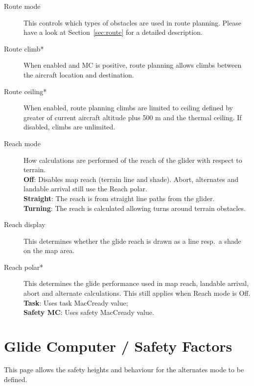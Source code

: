 \begin{description}
\item[Route mode]  \label{conf:routemode} This controls which types
  of obstacles are used in route planning. Please have a look at Section~\ref{sec:route} 
  for a detailed description.
\item[Route climb*]  \label{conf:routeclimb} When enabled and MC is positive, route 
  planning allows climbs between the aircraft location and destination.
\item[Route ceiling*]  \label{conf:routeceiling} When enabled, route planning climbs 
  are limited to ceiling defined by greater of current aircraft altitude plus 
  500 m and the thermal ceiling.  If disabled, climbs are unlimited.
\\
\item[Reach mode]  \label{conf:turningreach} How calculations are performed of 
  the reach of the glider with respect to terrain. \\
  {\bf Off}: Disables map reach (terrain line and shade). Abort, alternates
  and landable arrival still use the Reach polar. \\
  {\bf Straight}: The reach is from straight line paths from the glider. \\
  {\bf Turning}: The reach is calculated allowing turns around terrain obstacles.
\item[Reach display]  \label{conf:gliderange} This determines whether the
glide reach is drawn as a line resp.\ a shade on the map area.
\item[Reach polar*]  \label{conf:reachpolar} This determines the glide performance 
  used in map reach, landable arrival, abort and alternate calculations.
  This still applies when Reach mode is Off. \\
  {\bf Task}: Uses task MacCready value; \\
  {\bf Safety MC}: Uses safety MacCready value.
\end{description}


\section{Glide Computer / Safety Factors}\label{sec:safety-factors}

This page allows the safety heights and behaviour for the alternates mode to be defined.


